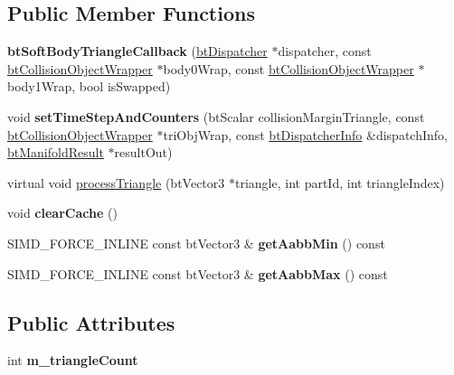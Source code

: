 \subsection*{Public Member Functions}
\begin{DoxyCompactItemize}
\item 
\mbox{\label{classbtSoftBodyTriangleCallback_a284cfe07d6c1a1ffeabfd7c48576e36f}} 
{\bfseries bt\+Soft\+Body\+Triangle\+Callback} (\hyperlink{classbtDispatcher}{bt\+Dispatcher} $\ast$dispatcher, const \hyperlink{structbtCollisionObjectWrapper}{bt\+Collision\+Object\+Wrapper} $\ast$body0\+Wrap, const \hyperlink{structbtCollisionObjectWrapper}{bt\+Collision\+Object\+Wrapper} $\ast$body1\+Wrap, bool is\+Swapped)
\item 
\mbox{\label{classbtSoftBodyTriangleCallback_ae0e0d1ffa14c1233dbcb90b874abdc80}} 
void {\bfseries set\+Time\+Step\+And\+Counters} (bt\+Scalar collision\+Margin\+Triangle, const \hyperlink{structbtCollisionObjectWrapper}{bt\+Collision\+Object\+Wrapper} $\ast$tri\+Obj\+Wrap, const \hyperlink{structbtDispatcherInfo}{bt\+Dispatcher\+Info} \&dispatch\+Info, \hyperlink{classbtManifoldResult}{bt\+Manifold\+Result} $\ast$result\+Out)
\item 
virtual void \hyperlink{classbtSoftBodyTriangleCallback_a0f8b46eba213eb55a451e182d2f6a9be}{process\+Triangle} (bt\+Vector3 $\ast$triangle, int part\+Id, int triangle\+Index)
\item 
\mbox{\label{classbtSoftBodyTriangleCallback_a75aaa07edcb61f8fbf451fb4c51a3185}} 
void {\bfseries clear\+Cache} ()
\item 
\mbox{\label{classbtSoftBodyTriangleCallback_a76dc70ebbec1ad7ac8bf35bf964fbdb4}} 
S\+I\+M\+D\+\_\+\+F\+O\+R\+C\+E\+\_\+\+I\+N\+L\+I\+NE const bt\+Vector3 \& {\bfseries get\+Aabb\+Min} () const
\item 
\mbox{\label{classbtSoftBodyTriangleCallback_a96d44815f2aa436d8b263936cd515d78}} 
S\+I\+M\+D\+\_\+\+F\+O\+R\+C\+E\+\_\+\+I\+N\+L\+I\+NE const bt\+Vector3 \& {\bfseries get\+Aabb\+Max} () const
\end{DoxyCompactItemize}
\subsection*{Public Attributes}
\begin{DoxyCompactItemize}
\item 
\mbox{\label{classbtSoftBodyTriangleCallback_ad80a7be0cd9ed248a758e667cf763efe}} 
int {\bfseries m\+\_\+triangle\+Count}
\end{DoxyCompactItemize}


